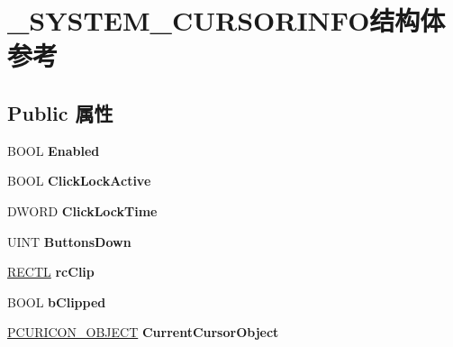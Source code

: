 \hypertarget{struct___s_y_s_t_e_m___c_u_r_s_o_r_i_n_f_o}{}\section{\+\_\+\+S\+Y\+S\+T\+E\+M\+\_\+\+C\+U\+R\+S\+O\+R\+I\+N\+F\+O结构体 参考}
\label{struct___s_y_s_t_e_m___c_u_r_s_o_r_i_n_f_o}
\subsection*{Public 属性}
\begin{DoxyCompactItemize}
\item 
\mbox{\label{struct___s_y_s_t_e_m___c_u_r_s_o_r_i_n_f_o_ad997480854cde976aac6db5d00feaea1}} 
B\+O\+OL {\bfseries Enabled}
\item 
\mbox{\label{struct___s_y_s_t_e_m___c_u_r_s_o_r_i_n_f_o_a07322c3c6950307c0df18968f54020f2}} 
B\+O\+OL {\bfseries Click\+Lock\+Active}
\item 
\mbox{\label{struct___s_y_s_t_e_m___c_u_r_s_o_r_i_n_f_o_acdf7bc76e3c876ceee06cbde89d9ce08}} 
D\+W\+O\+RD {\bfseries Click\+Lock\+Time}
\item 
\mbox{\label{struct___s_y_s_t_e_m___c_u_r_s_o_r_i_n_f_o_a8b6f71e2411eddfc65ff9f8f31f95b62}} 
U\+I\+NT {\bfseries Buttons\+Down}
\item 
\mbox{\label{struct___s_y_s_t_e_m___c_u_r_s_o_r_i_n_f_o_ab686d899bb066d70be3c8bfb7716f2c0}} 
\hyperlink{struct___r_e_c_t_l}{R\+E\+C\+TL} {\bfseries rc\+Clip}
\item 
\mbox{\label{struct___s_y_s_t_e_m___c_u_r_s_o_r_i_n_f_o_af6c87b2613235be89a1c8429e51d1b62}} 
B\+O\+OL {\bfseries b\+Clipped}
\item 
\mbox{\label{struct___s_y_s_t_e_m___c_u_r_s_o_r_i_n_f_o_a6e47561b0ed8baa1af32864724081fed}} 
\hyperlink{struct___c_u_r_i_c_o_n___o_b_j_e_c_t}{P\+C\+U\+R\+I\+C\+O\+N\+\_\+\+O\+B\+J\+E\+CT} {\bfseries Current\+Cursor\+Object}

\end{DoxyCompactItemize}
